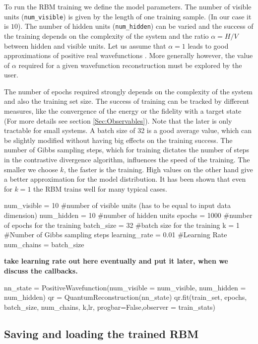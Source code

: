 \documentclass[submission, Phys]{SciPost}
\begin{document}
To run the RBM training we define the model parameters. The number of visible units (\verb|num_visible|) is given by the length of one training sample. (In our case it is $10$). 
The number of hidden units (\verb|num_hidden|) can be varied and the success of the training depends on the complexity of the system and the ratio $\alpha = H/V$ between hidden and visible units. Let us assume that $\alpha = 1$ leads to good approximations of positive real wavefunctions \cite{Torlai2016thermo}.  More generally however, the value of $\alpha$ required for a given wavefunction reconstruction must be explored by the user.

The number of epochs required strongly depends on the complexity of the system and also the training set size. The success of training can be tracked by different measures, like the convergence of the energy or the fidelity with a target state (For more details see section \ref{Sec:Observables}). Note that the later is only tractable for small systems. A batch size of 32 is a good average value, which can be slightly modified without having big effects on the training success. The number of Gibbs sampling steps,
which for training dictates the number of steps in the contrastive divergence algorithm, 
influences the speed of the training. The smaller we choose $k$, the faster is the training. High values on the other hand give a better approximation for the model distribution. It has been shown that even for $k=1$ the RBM trains well for many typical cases\cite{hinton2002training}.

\begin{python}
num_visible = 10 #number of visible units (has to be equal to input data dimension)
num_hidden = 10 #number of hidden units
epochs = 1000 #number of epochs for the training
batch_size = 32 #batch size for the training
k = 1 #Number of Gibbs sampling steps
learning_rate = 0.01 #Learning Rate
num_chains = batch_size
\end{python}

\textbf{take learning rate out here eventually and put it later, when we discuss the callbacks.}

\begin{python}
nn_state = PositiveWavefunction(num_visible = num_visible,
						                    num_hidden = num_hidden)
qr = QuantumReconstruction(nn_state)
qr.fit(train_set, epochs, batch_size, num_chains, k,lr, progbar=False,observer = train_stats)
\end{python}

\subsection{Saving and loading the trained RBM}
\end{document}
